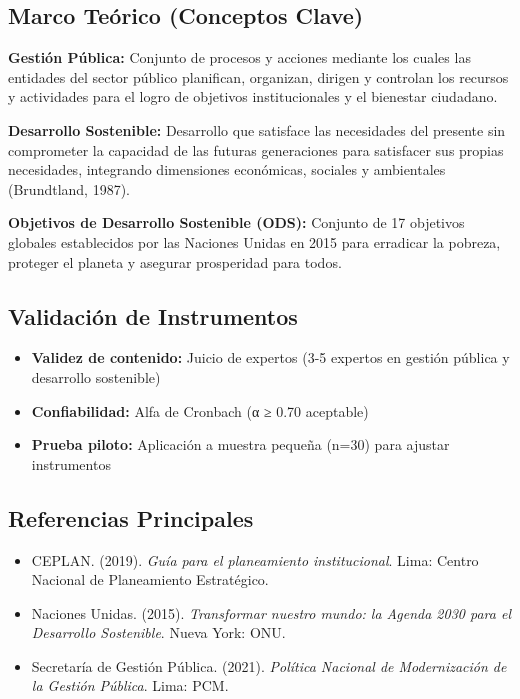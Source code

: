 \documentclass[
  man,
  floatsintext,
  longtable,
  a4paper,
  nolmodern,
  notxfonts,
  notimes,
  12pt,
  colorlinks=true,linkcolor=blue,citecolor=blue,urlcolor=blue]{apa7}
\providecommand{\tightlist}{%
  \setlength{\itemsep}{0pt}\setlength{\parskip}{0pt}}
\begin{document}
\subsection{Marco Teórico (Conceptos
Clave)}\label{marco-teuxf3rico-conceptos-clave-5}

\textbf{Gestión Pública:} Conjunto de procesos y acciones mediante los
cuales las entidades del sector público planifican, organizan, dirigen y
controlan los recursos y actividades para el logro de objetivos
institucionales y el bienestar ciudadano.

\textbf{Desarrollo Sostenible:} Desarrollo que satisface las necesidades
del presente sin comprometer la capacidad de las futuras generaciones
para satisfacer sus propias necesidades, integrando dimensiones
económicas, sociales y ambientales (Brundtland, 1987).

\textbf{Objetivos de Desarrollo Sostenible (ODS):} Conjunto de 17
objetivos globales establecidos por las Naciones Unidas en 2015 para
erradicar la pobreza, proteger el planeta y asegurar prosperidad para
todos.

\subsection{Validación de
Instrumentos}\label{validaciuxf3n-de-instrumentos}

\begin{itemize}
\tightlist
\item
  \textbf{Validez de contenido:} Juicio de expertos (3-5 expertos en
  gestión pública y desarrollo sostenible)
\item
  \textbf{Confiabilidad:} Alfa de Cronbach (α ≥ 0.70 aceptable)
\item
  \textbf{Prueba piloto:} Aplicación a muestra pequeña (n=30) para
  ajustar instrumentos
\end{itemize}

\subsection{Referencias Principales}\label{referencias-principales-5}

\begin{itemize}
\tightlist
\item
  CEPLAN. (2019). \emph{Guía para el planeamiento institucional}. Lima:
  Centro Nacional de Planeamiento Estratégico.
\item
  Naciones Unidas. (2015). \emph{Transformar nuestro mundo: la Agenda
  2030 para el Desarrollo Sostenible}. Nueva York: ONU.
\item
  Secretaría de Gestión Pública. (2021). \emph{Política Nacional de
  Modernización de la Gestión Pública}. Lima: PCM.
\end{itemize}
\end{document}
